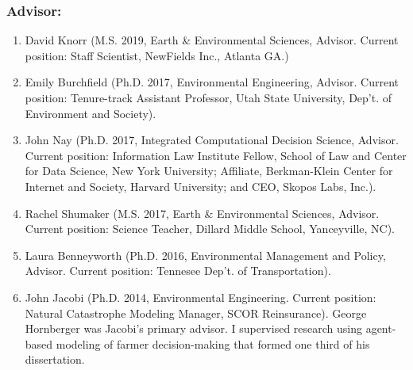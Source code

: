 \documentclass[10pt]{article}
\begin{document}
    \subsubsection{Advisor:}
    \begin{enumerate}
    \item David Knorr (M.S. 2019, Earth \& Environmental Sciences, Advisor. Current position: Staff Scientist, NewFields Inc., Atlanta GA.)
    \item Emily Burchfield (Ph.D. 2017, Environmental Engineering, Advisor. Current position: Tenure-track Assistant Professor, Utah State University, Dep't. of Environment and Society).
    \item John Nay (Ph.D. 2017, Integrated Computational Decision Science, Advisor. Current position: Information Law Institute Fellow, School of Law and Center for Data Science, New York University; Affiliate, Berkman-Klein Center for Internet and Society, Harvard University; and CEO, Skopos Labs, Inc.).
    \item Rachel Shumaker (M.S. 2017, Earth \& Environmental Sciences, Advisor. Current position: Science Teacher, Dillard Middle School, Yanceyville, NC).
    \item Laura Benneyworth (Ph.D. 2016, Environmental Management and Policy, Advisor. Current position: Tennesee Dep't. of Transportation).
    \item John Jacobi (Ph.D. 2014, Environmental Engineering. Current position: Natural Catastrophe Modeling Manager, SCOR Reinsurance). George Hornberger was Jacobi's primary advisor. I supervised research using agent-based modeling of farmer decision-making that formed one third of his dissertation.
    \end{enumerate}
\end{document}
